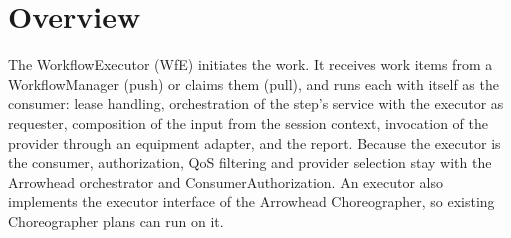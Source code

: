 \documentclass[a4paper]{arrowhead}
\begin{document}

\ArrowheadSetup

\begin{center}
  \vspace*{1cm}
  \huge{\arrowtitle}

  \vspace*{0.2cm}
  \LARGE{\arrowtype}
  \vspace*{1cm}

  
  \vspace*{\fill}

  

  \vspace*{1cm}
  \vspace*{\fill}

  \begin{abstract}
    This document describes the WorkflowExecutor, an Eclipse Arrowhead support system that runs the steps of workflow sessions: it has providers orchestrated for itself, invokes them through equipment adapters and reports the outcome to the WorkflowManager. Documentation edition 5.4.0; system version 5.4.0 (framework), service versions 1.0.0.
  \end{abstract}

  \vspace*{1cm}
\end{center}

\newpage

\tableofcontents
\newpage

\section{Overview}
\label{sec:overview}
The WorkflowExecutor (WfE) initiates the work. It receives work items from a WorkflowManager (push) or
claims them (pull), and runs each with itself as the consumer: lease handling, orchestration of the step's service
with the executor as requester, composition of the input from the session context, invocation of the provider through
an equipment adapter, and the report. Because the executor is the consumer, authorization, QoS filtering and provider
selection stay with the Arrowhead orchestrator and ConsumerAuthorization. An executor also implements the executor
interface of the Arrowhead Choreographer, so existing Choreographer plans can run on it.
\end{document}
